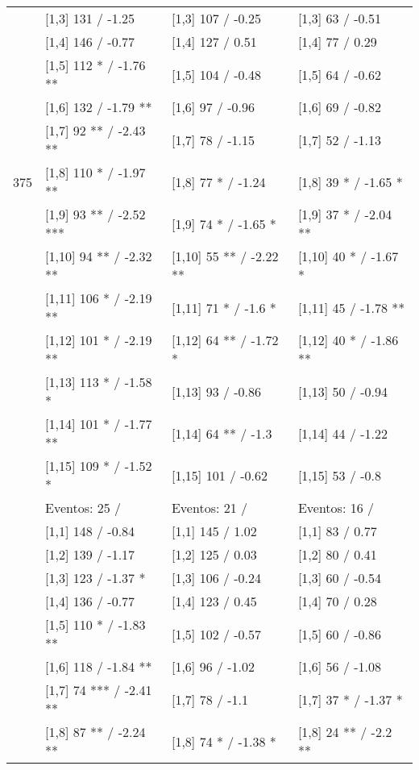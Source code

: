 \begin{table}
\begin{tabular}[t]{llll}
 & {}[1,3] 131  / -1.25 & {}[1,3] 107  / -0.25 & {}[1,3] 63  / -0.51\\
\addlinespace
 & {}[1,4] 146  / -0.77 & {}[1,4] 127  / 0.51 & {}[1,4] 77  / 0.29\\
 & {}[1,5] 112 * / -1.76 ** & {}[1,5] 104  / -0.48 & {}[1,5] 64  / -0.62\\
 & {}[1,6] 132  / -1.79 ** & {}[1,6] 97  / -0.96 & {}[1,6] 69  / -0.82\\
 & {}[1,7] 92 ** / -2.43 ** & {}[1,7] 78  / -1.15 & {}[1,7] 52  / -1.13\\
375 & {}[1,8] 110 * / -1.97 ** & {}[1,8] 77 * / -1.24 & {}[1,8] 39 * / -1.65 *\\
\addlinespace
 & {}[1,9] 93 ** / -2.52 *** & {}[1,9] 74 * / -1.65 * & {}[1,9] 37 * / -2.04 **\\
 & {}[1,10] 94 ** / -2.32 ** & {}[1,10] 55 ** / -2.22 ** & {}[1,10] 40 * / -1.67 *\\
 & {}[1,11] 106 * / -2.19 ** & {}[1,11] 71 * / -1.6 * & {}[1,11] 45  / -1.78 **\\
 & {}[1,12] 101 * / -2.19 ** & {}[1,12] 64 ** / -1.72 * & {}[1,12] 40 * / -1.86 **\\
 & {}[1,13] 113 * / -1.58 * & {}[1,13] 93  / -0.86 & {}[1,13] 50  / -0.94\\
\addlinespace
 & {}[1,14] 101 * / -1.77 ** & {}[1,14] 64 ** / -1.3 & {}[1,14] 44  / -1.22\\
 & {}[1,15] 109 * / -1.52 * & {}[1,15] 101  / -0.62 & {}[1,15] 53  / -0.8\\
 & Eventos:  25 / & Eventos:  21 / & Eventos:  16 /\\
 & {}[1,1] 148  / -0.84 & {}[1,1] 145  / 1.02 & {}[1,1] 83  / 0.77\\
 & {}[1,2] 139  / -1.17 & {}[1,2] 125  / 0.03 & {}[1,2] 80  / 0.41\\
\addlinespace
 & {}[1,3] 123  / -1.37 * & {}[1,3] 106  / -0.24 & {}[1,3] 60  / -0.54\\
 & {}[1,4] 136  / -0.77 & {}[1,4] 123  / 0.45 & {}[1,4] 70  / 0.28\\
 & {}[1,5] 110 * / -1.83 ** & {}[1,5] 102  / -0.57 & {}[1,5] 60  / -0.86\\
 & {}[1,6] 118  / -1.84 ** & {}[1,6] 96  / -1.02 & {}[1,6] 56  / -1.08\\
 & {}[1,7] 74 *** / -2.41 ** & {}[1,7] 78  / -1.1 & {}[1,7] 37 * / -1.37 *\\
\addlinespace
500 & {}[1,8] 87 ** / -2.24 ** & {}[1,8] 74 * / -1.38 * & {}[1,8] 24 ** / -2.2 **\\

\end{tabular}
\end{table}
